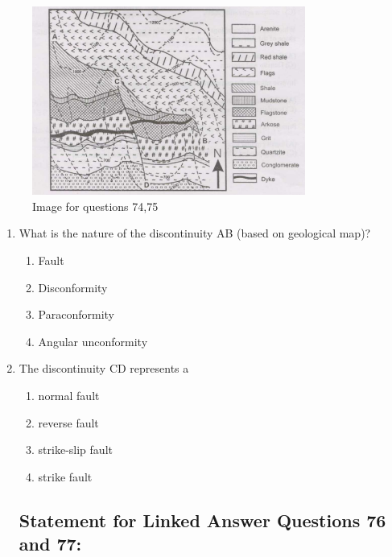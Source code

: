 \documentclass[journal,12pt,onecolumn]{IEEEtran}
\theoremstyle{remark}
\begin{document}
\begin{figure}[H]
    \centering
    \includegraphics[width=0.8\textwidth]{figs/fig2.png}
    \caption{Image for questions 74,75}
    \label{fig:question25}
\end{figure}

\begin{enumerate}[resume]
\item What is the nature of the discontinuity AB (based on geological map)?
\begin{enumerate}

\item Fault  
\item Disconformity  
\item Paraconformity  
\item Angular unconformity  
\vspace{0.5cm}
\end{enumerate}

\item The discontinuity CD represents a
\begin{enumerate}

\item normal fault  
\item reverse fault  
\item strike-slip fault  
\item strike fault  
\vspace{0.5cm}
\end{enumerate}

\subsection*{Statement for Linked Answer Questions 76 and 77:}
\end{enumerate}
\vspace{0.5cm}
\end{document}
